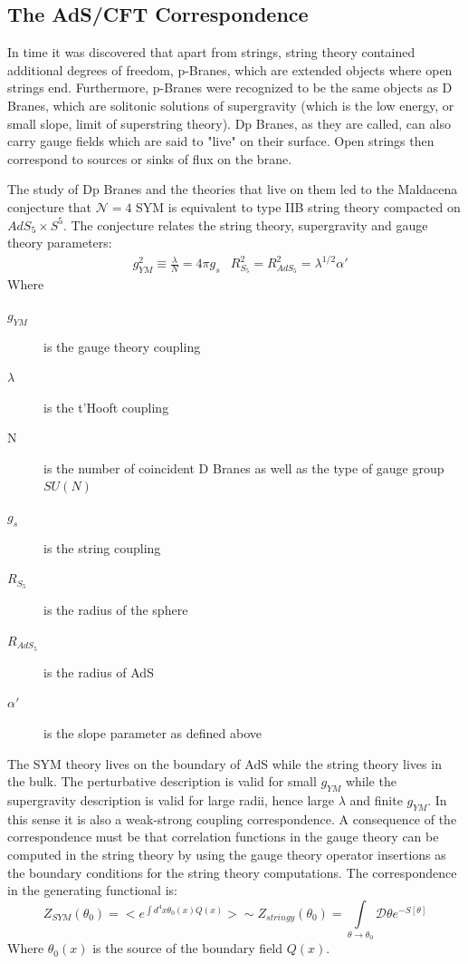 \documentclass[11pt,a4paper]{article}
\begin{document}
\subsection{The AdS/CFT Correspondence}

In time it was discovered that apart from strings, string theory contained additional degrees of freedom, p-Branes, which are extended objects where open strings end. Furthermore, p-Branes were recognized to be the same objects as D Branes, which are solitonic solutions of supergravity (which is the low energy, or small slope, limit of superstring theory). Dp Branes, as they are called, can also carry gauge fields which are said to "live" on their surface. Open strings then correspond to sources or sinks of flux on the brane.

The study of Dp Branes and the theories that live on them led to the Maldacena conjecture that $\mathcal{N}=4$ SYM is equivalent to type IIB string theory compacted on $AdS_5\times S^5$\cite{Maldacena97,Aharony11,Vecchia98}. The conjecture relates the string theory, supergravity and gauge theory parameters:
\begin{align}
&g_{YM}^2\equiv\frac{\lambda}{N}=4\pi g_s &R_{S_5}^2=R_{AdS_5}^2=\lambda^{1/2}\alpha'
\end{align}
Where
\begin{description}
\item[$g_{YM}$] is the gauge theory coupling
\item[$\lambda$] is the t'Hooft coupling
\item[N] is the number of coincident D Branes as well as the type of gauge group $SU\left(N\right)$
\item[$g_s$] is the string coupling
\item[$R_{S_5}$] is the radius of the sphere
\item[$R_{AdS_5}$] is the radius of AdS
\item[$\alpha'$] is the slope parameter as defined above
\end{description}

The SYM theory lives on the boundary of AdS while the string theory lives in the bulk. The perturbative description is valid for small $g_{YM}$ while the supergravity description is valid for large radii, hence large $\lambda$ and finite $g_{YM}$. In this sense it is also a weak-strong coupling correspondence. A consequence of the correspondence must be that correlation functions in the gauge theory can be computed in the string theory by using the gauge theory operator insertions as the boundary conditions for the string theory computations. The correspondence in the generating functional is:
\begin{equation}
Z_{SYM}\left(\theta_0\right)=< e^{\int d^4x\theta_0\left(x\right)Q\left(x\right)}>
\sim Z_{stringy}\left(\theta_0\right)=\int\limits_{\theta\rightarrow\theta_0}\mathcal{D}\theta e^{-S\left[\theta\right]}
\end{equation}
Where $\theta_0\left(x\right)$ is the source of the boundary field $Q\left(x\right)$.
\end{document}
